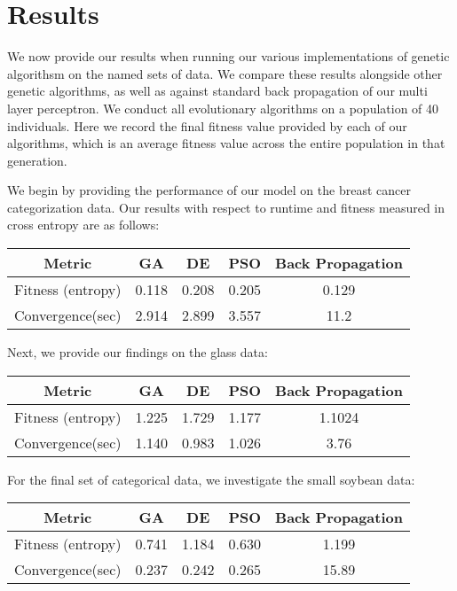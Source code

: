 \documentclass[twoside,11pt]{article}
\begin{document}
\section{Results}
We now provide our results when running our various implementations of genetic algorithsm on the named sets of data. We compare these results alongside other genetic algorithms,
as well as against standard back propagation of our multi layer perceptron. We conduct all evolutionary algorithms on a population of 40 individuals. Here we record the final
fitness value provided by each of our algorithms, which is an average fitness value across the entire population in that generation.

We begin by providing the performance of our model on the breast cancer categorization data. Our results with respect to runtime and fitness measured in cross entropy are as
follows:

\begin{center}
	\begin{tabular}{|c c c c c|}
		\hline
		Metric & GA & DE & PSO & Back Propagation \\ [0.5ex]
		\hline \hline
		Fitness (entropy)  & 0.118 & 0.208 & 0.205 & 0.129 \\
		\hline
		Convergence(sec) & 2.914 & 2.899 & 3.557 & 11.2 \\
		\hline
	\end{tabular}
\end{center}

Next, we provide our findings on the glass data:

\begin{center}
	\begin{tabular}{|c c c c c|}
		\hline
		Metric & GA & DE & PSO & Back Propagation \\ [0.5ex]
		\hline \hline
		Fitness (entropy)  & 1.225 & 1.729 & 1.177 &  1.1024\\
		\hline
		Convergence(sec) & 1.140 & 0.983 & 1.026 & 3.76\\
		\hline
	\end{tabular}
\end{center}

For the final set of categorical data, we investigate the small soybean data:

\begin{center}
	\begin{tabular}{|c c c c c|}
		\hline
		Metric & GA & DE & PSO & Back Propagation \\ [0.5ex]
		\hline \hline
		Fitness (entropy)  & 0.741 & 1.184 & 0.630 & 1.199 \\
		\hline
		Convergence(sec) & 0.237 & 0.242 & 0.265 & 15.89\\
		\hline
	\end{tabular}
\end{center}
\end{document}
